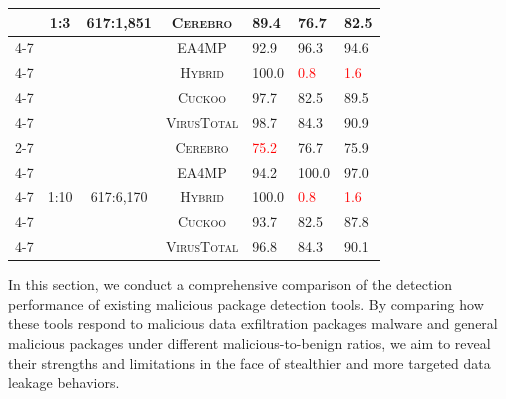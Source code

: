 \begin{table}[!t]
\begin{tabular}{|c|c|c|c|l|l|l|}
                    & \multirow{5}{*}{1:3}  & \multirow{5}{*}{617:1,851} & \textsc{Cerebro}    & 89.4      & 76.7                        & 82.5       \\ \cline{4-7} 
                    &                       &                            & \textsc{EA4MP}      & 92.9     & \textcolor{green!80!black}{96.3}                     & \textcolor{green!80!black}{94.6}       \\ \cline{4-7} 
                    &                       &                            & \textsc{Hybrid}     & 100.0     & \textcolor{red}{0.8}    & \textcolor{red}{1.6}       \\ \cline{4-7} 
                    &                       &                            & \textsc{Cuckoo}     & 97.7     & 82.5                     & 89.5       \\ \cline{4-7} 
                    &                       &                            & \textsc{VirusTotal} & 98.7      & 84.3                     & 90.9       \\ \cline{2-7} 
                    
                    & \multirow{5}{*}{1:10} & \multirow{5}{*}{617:6,170} & \textsc{Cerebro}    & \textcolor{red}{75.2}     & 76.7                    & 75.9       \\ \cline{4-7} 
                     &                       &                            & \textsc{EA4MP}      & 94.2                       & \textcolor{green!80!black}{100.0}                 & \textcolor{green!80!black}{97.0}       \\ \cline{4-7}
                    &                       &                            & \textsc{Hybrid}     & 100.0                    & \textcolor{red}{0.8}    & \textcolor{red}{1.6}       \\ \cline{4-7} 
                    &                       &                            & \textsc{Cuckoo}     & 93.7                       & 82.5                    & 87.8       \\ \cline{4-7} 
                    &                       &                            & \textsc{VirusTotal} & 96.8                       & 84.3                    & 90.1       \\ \hline 
                   
\end{tabular}
\end{table}



In this section, we conduct a comprehensive comparison of the detection performance of existing malicious package detection tools. By comparing how these tools respond to malicious data exfiltration packages malware and general malicious packages under different malicious-to-benign ratios, we aim to reveal their strengths and limitations in the face of stealthier and more targeted data leakage behaviors. 

